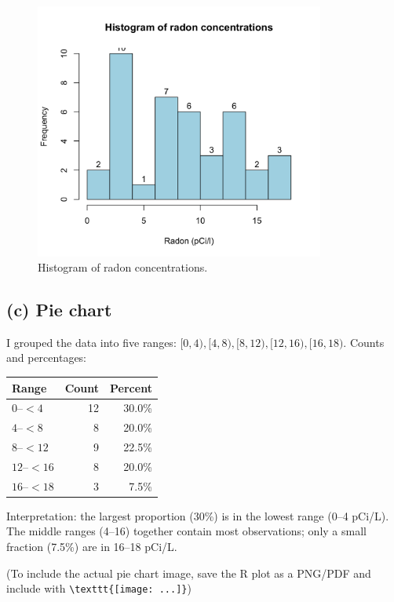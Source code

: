 \documentclass[12pt]{article}
\begin{document}
\begin{figure}[H]
\centering
\includegraphics[width=0.85\textwidth]{1.4.14_b.png}
\caption{Histogram of radon concentrations.}
\end{figure}

\subsection*{(c) Pie chart}
I grouped the data into five ranges: $[0,4),[4,8),[8,12),[12,16),[16,18)$. Counts and percentages:

\begin{tabular}{lrr}
\toprule
Range & Count & Percent \\
\midrule
$0$--$<4$   & 12 & 30.0\% \\
$4$--$<8$   & 8  & 20.0\% \\
$8$--$<12$  & 9  & 22.5\% \\
$12$--$<16$ & 8  & 20.0\% \\
$16$--$<18$ & 3  & 7.5\% \\
\bottomrule
\end{tabular}

\medskip

Interpretation: the largest proportion (30\%) is in the lowest range (0--4 pCi/L). The middle ranges (4--16) together contain most observations; only a small fraction (7.5\%) are in 16--18 pCi/L. 

\noindent (To include the actual pie chart image, save the R plot as a PNG/PDF and include with \verb|\texttt{[image: ...]}|)
\end{document}
